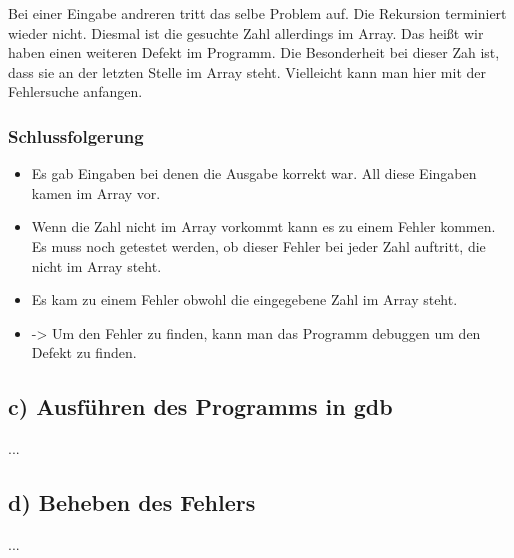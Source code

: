 \documentclass[12pt]{article}
\begin{document}

Bei einer Eingabe andreren tritt das selbe Problem auf. Die Rekursion terminiert wieder nicht. Diesmal ist die gesuchte Zahl allerdings im Array. Das heißt wir haben einen weiteren Defekt im Programm. Die Besonderheit bei dieser Zah ist, dass sie an der letzten Stelle im Array steht. Vielleicht kann man hier mit der Fehlersuche anfangen.

\subsubsection{Schlussfolgerung}

\begin{itemize}
\item Es gab Eingaben bei denen die Ausgabe korrekt war. All diese Eingaben kamen im Array vor.
\item Wenn die Zahl nicht im Array vorkommt kann es zu einem Fehler kommen. Es muss noch getestet werden, ob dieser Fehler bei jeder Zahl auftritt, die nicht im Array steht.
\item Es kam zu einem Fehler obwohl die eingegebene Zahl im Array steht.
\item -> Um den Fehler zu finden, kann man das Programm debuggen um den Defekt zu finden.
\end{itemize}






\subsection{c) Ausführen des Programms in gdb}
...

\subsection{d) Beheben des Fehlers}
...
\end{document}
